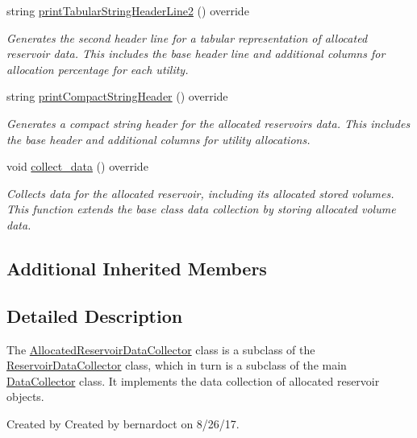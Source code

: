 \begin{DoxyCompactItemize}
string \mbox{\hyperlink{classAllocatedReservoirDataCollector_a30d8c59205862822f6548472ba62e537}{print\+Tabular\+String\+Header\+Line2}} () override
\begin{DoxyCompactList}\small\item\em Generates the second header line for a tabular representation of allocated reservoir data. This includes the base header line and additional columns for allocation percentage for each utility. \end{DoxyCompactList}\item 
string \mbox{\hyperlink{classAllocatedReservoirDataCollector_adbedebdf593bee81447671fb8f6ef2fe}{print\+Compact\+String\+Header}} () override
\begin{DoxyCompactList}\small\item\em Generates a compact string header for the allocated reservoir\textquotesingle{}s data. This includes the base header and additional columns for utility allocations. \end{DoxyCompactList}\item 
void \mbox{\hyperlink{classAllocatedReservoirDataCollector_a8ef8451d2cc6eb01b205eee75ab93729}{collect\+\_\+data}} () override
\begin{DoxyCompactList}\small\item\em Collects data for the allocated reservoir, including its allocated stored volumes. This function extends the base class data collection by storing allocated volume data. \end{DoxyCompactList}\end{DoxyCompactItemize}
\subsection*{Additional Inherited Members}


\subsection{Detailed Description}
The {\ttfamily \mbox{\hyperlink{classAllocatedReservoirDataCollector}{Allocated\+Reservoir\+Data\+Collector}}} class is a subclass of the {\ttfamily \mbox{\hyperlink{classReservoirDataCollector}{Reservoir\+Data\+Collector}}} class, which in turn is a subclass of the main {\ttfamily \mbox{\hyperlink{classDataCollector}{Data\+Collector}}} class. It implements the data collection of allocated reservoir objects. 

Created by Created by bernardoct on 8/26/17. 

